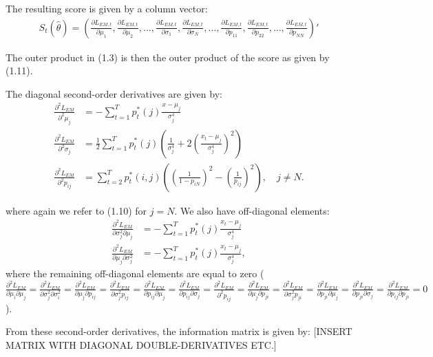 \documentclass[11pt,a4paper,oneside]{article}
\newcommand{\lp}{\left(}
\newcommand{\rp}{\right)}
\newcommand{\sumt}{\sum_{t=1}^T}
\begin{document}
The resulting score is given by a column vector:
\begin{align}
    S_t\lp \hat\theta\rp = \lp \frac{\partial L_{EM, t}}{\partial \mu_1}, \frac{\partial L_{EM, t}}{\partial \mu_2}, \dots,\frac{\partial L_{EM, t}}{\partial \sigma_1}, \frac{\partial L_{EM, t}}{\partial \sigma_N},\dots, \frac{\partial L_{EM, t}}{\partial p_{11}}, \frac{\partial L_{EM, t}}{\partial p_{22}}, \dots, \frac{\partial L_{EM, t}}{\partial p_{NN}}\rp'
\end{align}

The outer product in (1.3) is then the outer product of the score as given by (1.11).

The diagonal second-order derivatives are given by:
\begin{align}
    \frac{\partial^2 L_{EM}}{\partial^2 \mu_j} &= -\sumt p_t^*\lp j\rp \frac{x - \mu_j}{\sigma_j^4} \\
    \frac{\partial^2 L_{EM}}{\partial^2 \sigma_j} &= \frac{1}{2}\sumt p_t^*\lp j\rp \lp \frac{1}{\sigma_j^4} + 2\lp \frac{x_t- \mu_j}{\sigma_j^4}\rp^2\rp \\
    \frac{\partial^2 L_{EM}}{\partial^2 p_{ij}} &= \sum_{t=2}^T p_t^*\lp i, j\rp \lp \lp\frac{1}{1 - p_{iN}}\rp^2 - \lp \frac{1}{p_{ij}}\rp^2\rp, \quad j \neq N.
\end{align}

where again we refer to (1.10) for $j = N$. We also have off-diagonal elements:
\begin{align}
    \frac{\partial^2 L_{EM}}{\partial \sigma_j^2\partial \mu_j} &= - \sumt p_t^*\lp j\rp  \frac{x_t - \mu_j}{\sigma_j^4}\\
    \frac{\partial^2 L_{EM}}{\partial \mu_j \partial \sigma_j^2} &= -\sumt p_t^*\lp j\rp \frac{x_t - \mu_j}{\sigma_j^4},
\end{align}
where the remaining off-diagonal elements are equal to zero ($
    \frac{\partial^2 L_{EM}}{\partial \mu_i \partial \mu_j} = \frac{\partial^2 L_{EM}}{\partial \sigma_j^2 \partial \sigma_i^2} = \frac{\partial^2 L_{EM}}{\partial \mu_j \partial p_{ij}}=\frac{\partial^2 L_{EM}}{\partial \sigma_j^2 p_{ij}} = \frac{\partial^2 L_{EM}}{\partial p_{ij}\partial \mu_j} = \frac{\partial^2 L_{EM}}{\partial p_{ij}\partial \sigma_j} = \frac{\partial^2 L_{EM}}{\partial^2 p_{ij}} = \frac{\partial^2 L_{EM}}{\partial \mu_j \partial p_{ji}}=\frac{\partial^2 L_{EM}}{\partial \sigma_j^2 p_{ji}} = \frac{\partial^2 L_{EM}}{\partial p_{ji}\partial \mu_j} = \frac{\partial^2 L_{EM}}{\partial p_{ji}\partial \sigma_j} = \frac{\partial^2 L_{EM}}{\partial p_{ij}\partial p_{ji}} = 0$).
    
From these second-order derivatives, the information matrix is given by:
[INSERT MATRIX WITH DIAGONAL DOUBLE-DERIVATIVES ETC.]
\end{document}
